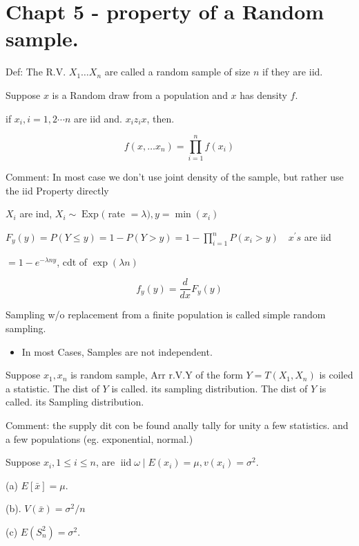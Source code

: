\documentclass[10pt]{article}
\begin{document}
\section*{Chapt 5 - property of a Random sample.}

Def: The R.V. $X_{1} \ldots X_{n}$ are called a random sample of size $n$ if they are iid.

\begin{example}
  Suppose $x$ is a Random draw from a population and $x$ has density $f$.
\end{example}

if $x_{i}, i=1,2 \cdots n$ are iid and. $x_{i} z_{i} x$, then.

$$
f\left(x, \ldots x_{n}\right)=\prod_{i=1}^{n} f\left(x_{i}\right)
$$

Comment: In most case we don't use joint density of the sample, but rather use the iid Property directly

\begin{example}
  $X_{i}$ are ind, $X_{i} \sim \operatorname{Exp}($ rate $= \lambda), y=\min \left(x_{i}\right)$
\end{example}

$F_{y}(y)=P(Y \leq y)=1-P(Y>y)=1-\prod_{i=1}^{n} P\left(x_{i}>y\right) \quad x^{\prime} s$ are iid

$=1-e^{-\lambda n y}$, cdt of $\exp (\lambda n)$

$$
f_{y}(y)=\frac{d}{d x} F_{y}(y)
$$

\begin{definition}
  Sampling w/o replacement from a finite population is called simple random sampling.
\end{definition}

\begin{itemize}
  \item In most Cases, Samples are not independent.
\end{itemize}

\begin{definition}
  Suppose $x_{1}, x_{n}$ is random sample, Arr r.V.Y of the form $Y=T\left(X_{1}, X_{n}\right)$ is coiled a statistic. The dist of $Y$ is called. its sampling distribution. The dist of $Y$ is called. its Sampling distribution.
\end{definition}

Comment: the supply dit con be found anally tally for unity a few statistics. and a few populations (eg. exponential, normal.)

\begin{theorem}
  Suppose $x_{i}, 1 \leq i \leq n$, are $\operatorname{iid} \omega \mid E\left(x_{i}\right)=\mu, v\left(x_{i}\right)=\sigma^{2}$.

(a) $E[\bar{x}]=\mu$.

(b). $V(\bar{x})=\sigma^{2} / n$

(c) $E\left(S_{n}^{2}\right)=\sigma^{2}$.
\end{theorem}
\end{document}
